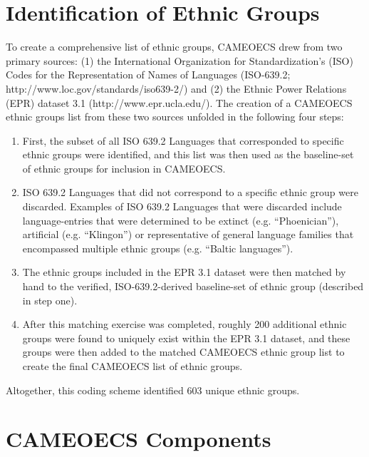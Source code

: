 \documentclass[12pt]{article}
\begin{document}
\section{Identification of Ethnic Groups}\label{sect:CAMEOECSIdent}
To create a comprehensive list of ethnic groups, CAMEOECS drew from two primary sources: (1) the International Organization for Standardization's (ISO) Codes for the Representation of Names of Languages (ISO-639.2; http://www.loc.gov/standards/iso639-2/) and (2) the Ethnic Power Relations (EPR) dataset 3.1 (http://www.epr.ucla.edu/).  The creation of a CAMEOECS ethnic groups list from these two sources unfolded in the following four steps:
\begin{enumerate}
\item First, the subset of all ISO 639.2 Languages that corresponded to specific ethnic groups were identified, and this list was then used as the baseline-set of ethnic groups for inclusion in CAMEOECS.
\item ISO 639.2 Languages that did not correspond to a specific ethnic group were discarded.  Examples of ISO 639.2 Languages that were discarded include language-entries that were determined to be extinct (e.g. ``Phoenician''), artificial (e.g. ``Klingon'') or representative of general language families that encompassed multiple ethnic groups (e.g. ``Baltic languages'').
\item The ethnic groups included in the EPR 3.1 dataset were then matched by hand to the verified, ISO-639.2-derived baseline-set of ethnic group (described in step one).
\item After this matching exercise was completed, roughly 200 additional ethnic groups were found to uniquely exist within the EPR 3.1 dataset, and these groups were then added to the matched CAMEOECS ethnic group list to create the final CAMEOECS list of ethnic groups.
\end{enumerate}
Altogether, this coding scheme identified 603 unique ethnic groups.

\section{CAMEOECS Components}
\end{document}

